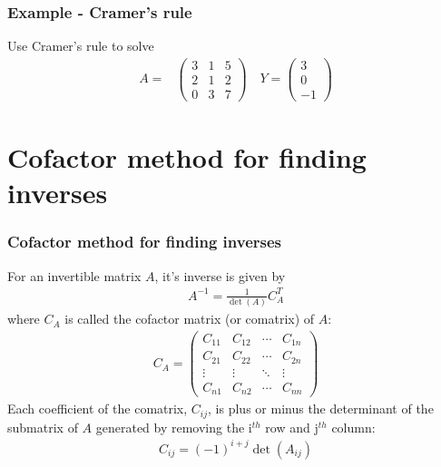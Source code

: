 \documentclass[usenames,dvipsnames,aspectratio=169,10pt]{beamer}
\numberwithin{equation}{section}
\begin{document}
\begin{frame}
\frametitle{Example - Cramer's rule}

\begin{minipage}{0.4\textwidth}
Use Cramer’s rule to solve
\begin{align*}
A =& 
\begin{pmatrix}
3 & 1 & 5 \\
2 & 1 & 2 \\
0 & 3 & 7 
\end{pmatrix}
\quad
Y = 
\begin{pmatrix}
3 \\ 0 \\ -1
\end{pmatrix}
\end{align*}
\end{minipage}
\vspace{4cm}
\end{frame}
\fi 


\section{Cofactor method for finding inverses}

\begin{frame}
\frametitle{Cofactor method for finding inverses}
For an invertible matrix $A$, it's inverse is given by
\begin{align*}
A^{-1} = \frac{1}{\det(A)}C_A^T
\end{align*}
where $C_A$ is called the cofactor matrix (or comatrix) of $A$:
\begin{align*}
C_A = \begin{pmatrix}
C_{11} & C_{12} & \cdots & C_{1n} \\
C_{21} & C_{22} & \cdots & C_{2n} \\
\vdots & \vdots & \ddots & \vdots \\
C_{n1} & C_{n2} & \cdots & C_{nn}
\end{pmatrix}
\end{align*}
Each coefficient of the comatrix, $C_{ij}$, is plus or minus the determinant of the submatrix of $A$ generated by removing the i$^{th}$ row and j$^{th}$ column:
\begin{align*}
C_{ij} = (-1)^{i+j}\det(A_{ij})
\end{align*}

\end{frame}
\end{document}
